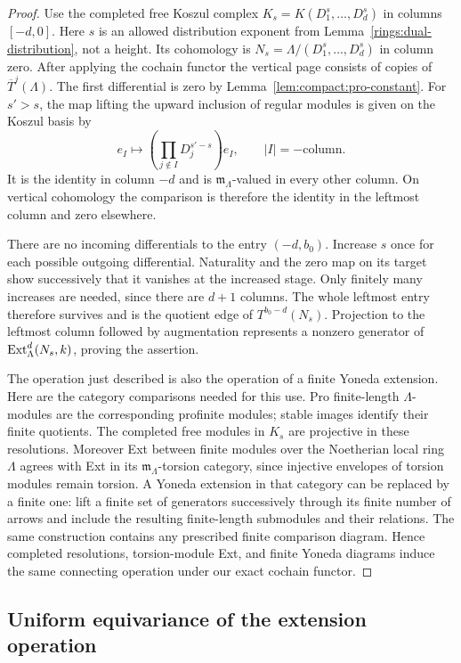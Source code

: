 \begin{proof}
Use the completed free Koszul complex
$K_s=K(D_1^s,\ldots,D_d^s)$ in columns $[-d,0]$.
Here $s$ is an allowed distribution exponent from
Lemma~\ref{rings:dual-distribution}, not a height.
Its cohomology is $N_s=\Lambda/(D_1^s,\ldots,D_d^s)$ in column zero.
After applying the cochain functor the vertical page consists of
copies of $\overline T^j(\Lambda)$.  The first differential is zero
by Lemma~\ref{lem:compact:pro-constant}.
For $s'>s$, the map lifting the upward inclusion of regular modules is
given on the Koszul basis by
\[
 e_I\longmapsto
       \left(\prod_{j\notin I}D_j^{s'-s}\right)e_I,
                 \qquad |I|=-\text{column}.
\]
It is the identity in column $-d$ and is
$\mathfrak m_\Lambda$-valued in every other column.  On vertical
cohomology the comparison is therefore the identity in the leftmost
column and zero elsewhere.

There are no incoming differentials to the entry $(-d,b_0)$.
Increase $s$ once for each possible outgoing differential.  Naturality
and the zero map on its target show successively that it vanishes at
the increased stage.  Only finitely many increases are needed, since
there are $d+1$ columns.  The whole leftmost entry therefore survives
and is the quotient edge of $T^{b_0-d}(N_s)$.  Projection to the
leftmost column followed by augmentation represents a nonzero generator
of $\operatorname{Ext}^d_\Lambda(N_s,k)$, proving the assertion.

The operation just described is also the operation of a finite Yoneda
extension.  Here are the category comparisons needed for this use.
Pro finite-length $\Lambda$-modules are the corresponding profinite
modules; stable images identify their finite quotients.  The completed
free modules in $K_s$ are projective in these resolutions.  Moreover
Ext between finite modules over the Noetherian local ring $\Lambda$
agrees with Ext in its $\mathfrak m_\Lambda$-torsion category, since
injective envelopes of torsion modules remain torsion.  A Yoneda
extension in that category can be replaced by a finite one: lift a
finite set of generators successively through its finite number of
arrows and include the resulting finite-length submodules and their
relations.  The same construction contains any prescribed finite
comparison diagram.  Hence completed resolutions, torsion-module Ext,
and finite Yoneda diagrams induce the same connecting operation under
our exact cochain functor.
\end{proof}

\subsection{Uniform equivariance of the extension operation}

